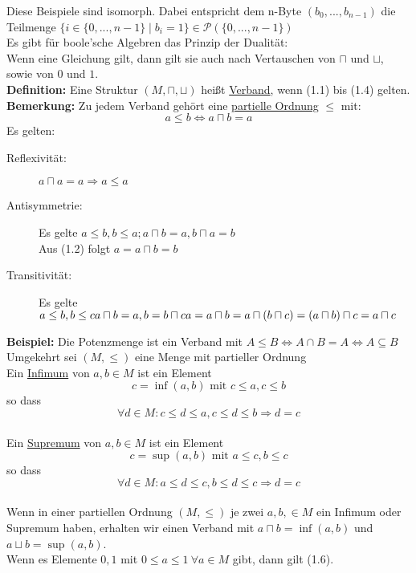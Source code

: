 \documentclass[a4paper]{scrartcl}
\begin{document}
Diese Beispiele sind isomorph. Dabei entspricht dem n-Byte $(b_0,...,b_{n-1})$ die Teilmenge $\{i \in \{0,...,n-1\}\mid b_i = 1\} \in \mathcal{P}(\{0,...,n-1\})$\medskip\\
Es gibt für boole'sche Algebren das Prinzip der Dualität:\\
Wenn eine Gleichung gilt, dann gilt sie auch nach Vertauschen von $\sqcap$ und $\sqcup$, sowie von $0$ und $1$.\medskip\\
\textbf{Definition:} Eine Struktur $(M,\sqcap,\sqcup)$ heißt \underline{Verband}, wenn (1.1) bis (1.4) gelten.\medskip\\
\textbf{Bemerkung:} Zu jedem Verband gehört eine \underline{partielle Ordnung} $\leq$ mit:
$$a \leq b \Leftrightarrow a \sqcap b = a$$
Es gelten:
\begin{description}
\item[Reflexivität:] $a \sqcap a = a \Rightarrow a \leq a$
\item[Antisymmetrie:] Es gelte $a \leq b, b \leq a; a \sqcap b = a, b \sqcap a = b$\\ Aus (1.2) folgt $a = a \sqcap b = b$
\item[Transitivität:]Es gelte $a \leq b, b \leq c\\a \sqcap b = a, b = b \sqcap c\\a=a \sqcap b = a \sqcap (b \sqcap c) = (a \sqcap b) \sqcap c = a \sqcap c$
\end{description}
\textbf{Beispiel:} Die Potenzmenge ist ein Verband mit $A \leq B \Leftrightarrow A \cap B = A \Leftrightarrow A \subseteq B$\medskip\\
Umgekehrt sei $(M,\leq)$ eine Menge mit partieller Ordnung\medskip\\
Ein \underline{Infimum} von $a,b \in M$ ist ein Element 
$$c=\inf(a,b)\text{ mit }c \leq a, c\leq b$$
so dass
$$\forall d \in M: c \leq d \leq a, c \leq d \leq b \Rightarrow d = c$$\ \medskip\\
Ein \underline{Supremum} von $a,b \in M$ ist ein Element 
$$c=\sup(a,b)\text{ mit }a \leq c, b \leq c$$
so dass
$$\forall d \in M: a \leq d \leq c, b \leq d \leq c \Rightarrow d = c$$\ \medskip\\
Wenn in einer partiellen Ordnung $(M,\leq)$ je zwei $a,b, \in M$ ein Infimum oder Supremum haben, erhalten wir einen Verband mit $a \sqcap b = \inf(a,b)$ und $a \sqcup b = \sup(a,b)$.\medskip\\
Wenn es Elemente $0,1$ mit $0 \leq a \leq 1\ \forall a \in M$ gibt, dann gilt (1.6).\medskip\\
\end{document}
